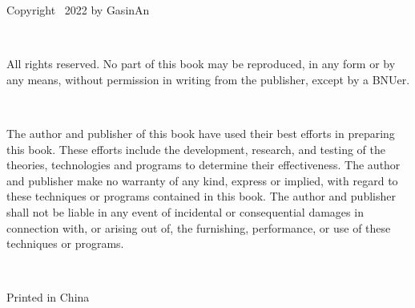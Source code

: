 \noindent Copyright \textcopyright~2022 by GasinAn

\ 

\noindent All rights reserved. No part of this book may be reproduced, 
in any form or by any means, without permission in writing from the publisher, except by a BNUer.

\ 

\noindent The author and publisher of this book have used their best efforts
in preparing this book. These efforts include the development, research, and testing of the theories,
technologies and programs to determine their effectiveness.
The author and publisher make no warranty of any kind, express or implied,
with regard to these techniques or programs contained in this book.
The author and publisher shall not be liable in any event of incidental or consequential damages
in connection with, or arising out of, the furnishing, performance, or use of these techniques or programs.

\ 

\noindent Printed in China
